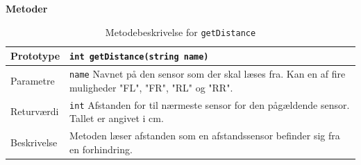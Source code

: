 \textbf{Metoder}

\begin{table}[h]
\begin{tabularx}{\textwidth}{| L{2.5 cm} | Z |} \hline
Prototype & \texttt{int getDistance(string name)} \\\hline
Parametre & \texttt{name} \newline Navnet på den sensor som der skal læses fra. Kan en af fire muligheder "FL", "FR", "RL" og "RR". \\\hline
Returværdi &  \texttt{int} \newline Afstanden for til nærmeste sensor for den pågældende sensor. Tallet er angivet i cm. \\\hline
Beskrivelse & Metoden læser afstanden som en afstandssensor befinder sig fra en forhindring. \\\hline
\end{tabularx}
\caption{Metodebeskrivelse for \texttt{getDistance}}
\label{table:met_getdistance}
\end{table}